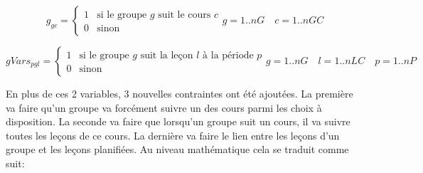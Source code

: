 \begin{equation*}
    g_{gc} =
    \begin{cases}
    1 & \text{si le groupe $g$ suit le cours $c$} \\
    0 & \text{sinon}
    \end{cases}
    g = 1 .. nG \quad c = 1 .. nGC
\end{equation*}

\begin{equation*}
    gVars_{pgl} =
    \begin{cases}
    1 & \text{si le groupe $g$ suit la leçon $l$ à la période $p$} \\
    0 & \text{sinon}
    \end{cases}
    g = 1 .. nG \quad l = 1 .. nLC \quad p = 1 .. nP
\end{equation*}

En plus de ces 2 variables, 3 nouvelles contraintes ont été ajoutées. La première va faire qu'un groupe va forcément suivre un des cours parmi les choix à disposition. La seconde va faire que lorsqu'un groupe suit un cours, il va suivre toutes les leçons de ce cours. La dernière va faire le lien entre les leçons d'un groupe et les leçons planifiées. Au niveau mathématique cela se traduit comme suit:

